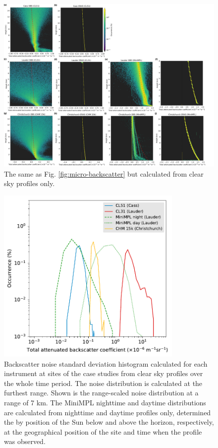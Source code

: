 \begin{figure}[t]
\centering
\includegraphics[width=\textwidth]{chapter3/fig/backscatter_hist_micro_clear.png}
\caption{
The same as Fig. \ref{fig:micro-backscatter} but calculated from clear
sky profiles only.
}
\label{fig:micro-backscatter-clear}
\end{figure}

\clearpage

\begin{figure}[t]
\centering
\includegraphics[width=0.8\textwidth]{chapter3/fig/backscatter_sd_hist.pdf}
\caption[Backscatter noise standard deviation histogram]{
Backscatter noise standard deviation histogram calculated for each instrument
at sites of the case studies from clear sky profiles over the whole time period.
The noise distribution is calculated at the furthest range. Shown is the
range-scaled noise distribution at a range of 7 km. The MiniMPL nighttime and daytime
distributions are calculated from nighttime and daytime profiles only, determined
the by position of the Sun below and above the horizon, respectively, at
the geographical position of the site and time when the profile was observed.
}
\label{fig:backscatter-sd-hist}
\end{figure}

